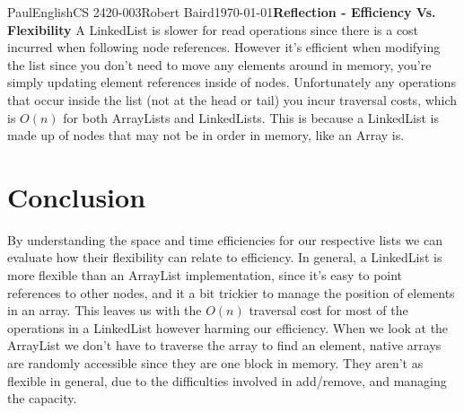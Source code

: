\documentclass[12pt,letterpaper]{article}
\begin{document}
\begin{mla}{Paul}{English}{CS 2420-003}{Robert Baird}{\today}{\textbf{Reflection - Efficiency Vs. Flexibility}}
A LinkedList is slower for read operations since there is a cost incurred when following node references. However it's efficient when modifying the list since you don't need to move any elements around in memory, you're simply updating element references inside of nodes. Unfortunately any operations that occur inside the list (not at the head or tail) you incur traversal costs, which is $O(n)$ for both ArrayLists and LinkedLists. This is because a LinkedList is made up of nodes that may not be in order in memory, like an Array is.


\section{Conclusion}

By understanding the space and time efficiencies for our respective lists we can evaluate how their flexibility can relate to efficiency. In general, a LinkedList is more flexible than an ArrayList implementation, since it's easy to point references to other nodes, and it a bit trickier to manage the position of elements in an array. This leaves us with the $O(n)$ traversal cost for most of the operations in a LinkedList however harming our efficiency. When we look at the ArrayList we don't have to traverse the array to find an element, native arrays are randomly accessible since they are one block in memory. They aren't as flexible in general, due to the difficulties involved in add/remove, and managing the capacity.




\end{mla}
\end{document}

